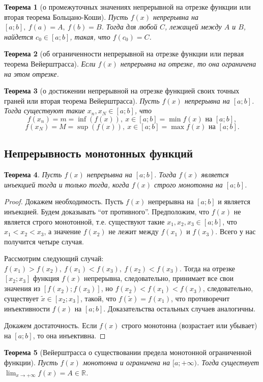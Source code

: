 \documentclass[a4paper,12pt]{article} %
\newtheorem{theorem}{Теорема}[section]
\theoremstyle{remark}
\theoremstyle{definition}
\begin{document}
\begin{theorem}[о промежуточных значениях непрерывной на отрезке функции или вторая теорема Больцано-Коши]
    Пусть $f(x)$ непрерывна на $[a; b], \ f(a) = A, \ f(b) = B$. Тогда для любой $C$, лежащей между $A$ и $B$, найдется $c_0 \in [a; b]$, такая, что $f(c_0) = C$.
\end{theorem}

\begin{theorem}[об ограниченности непрерывной на отрезке функции или первая теорема Вейерштрасса]
    Если $f(x)$ непрерывна на отрезке, то она ограничена на этом отрезке. 
\end{theorem}

\begin{theorem}[о достижении непрерывной на отрезке функцией своих точных граней или вторая теорема Вейерштрасса]
    Пусть $f(x)$ непрерывна на $[a; b]$. Тогда существуют такие $x_{n}, x_N \in [a; b]$, что
    \[ f(x_{n}) = m = \inf(f(x)), \ x\in [a; b] = \min f(x) \text{ на } [a; b] ,\] 
    \[ f(x_{N}) = M = \sup(f(x)), \ x\in [a; b] = \max f(x) \text{ на } [a; b] .\] 
\end{theorem}

\subsection{Непрерывность монотонных функций}
\begin{theorem}
    Пусть $f(x)$ непрерывна на $[a; b]$. Тогда $f(x)$ является инъекцией тогда и только тогда, когда $f(x)$ строго монотонна на $[a; b]$.
\end{theorem}
\begin{proof}
    Докажем необходимость. Пусть $f(x)$ непрерывна на $[a; b]$ и является инъекцией. Будем доказывать ``от противного''. Предположим, что $f(x)$ не является строго монотонной, т.е. существуют такие $x_1, x_2, x_3 \in [a; b]$, что $x_1 < x_2 < x_3$, а значение $f(x_2)$ не лежит между $f(x_1)$ и $f(x_3)$. Всего у нас получится четыре случая.

    Рассмотрим следующий случай: $f(x_1) > f(x_2), \ f(x_1) < f(x_3), \ f(x_2) < f(x_3)$. Тогда на отрезке $[x_2; x_3]$ функция $f(x)$ непрерывна, следовательно, принимает все свои значения из $[f(x_2); f(x_3)]$, но $f(x_2) < f(x_1) < f(x_3)$, следовательно, существует $\widetilde{x} \in [x_2; x_3]$, такой, что $f(\widetilde{x}) = f(x_1)$, что противоречит инъективности $f(x)$ на $[a; b]$. Доказательства остальных случаев аналогичны.

    Докажем достаточность. Если $f(x)$ строго монотонна (возрастает или убывает) на $[a; b]$, то она инъективна.
\end{proof}

\begin{theorem}[Вейерштрасса о существовании предела монотонной ограниченной функции]
    Пусть $f(x)$ монотонна и ограничена на $[a; +\infty)$. Тогда существует $\displaystyle \lim_{x \to +\infty} f(x) = A \in \mathbb{R}$.
\end{theorem}
\end{document}
